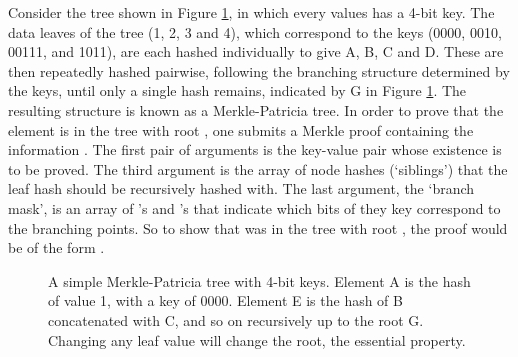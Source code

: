 Consider the tree shown in Figure \ref{fig:Merkleexample}, in which every values has a 4-bit key. The data leaves of the tree (1, 2, 3 and 4), which correspond to the keys (0000, 0010, 00111, and 1011), are each hashed individually to give A, B, C and D. These are then repeatedly hashed pairwise, following the branching structure determined by the keys, until only a single hash remains, indicated by G in Figure \ref{fig:Merkleexample}. The resulting structure is known as a Merkle-Patricia tree. In order to prove that the element  is in the tree with root , one submits a Merkle proof containing the information . The first pair of arguments is the key-value pair whose existence is to be proved. The third argument is the array of node hashes (`siblings') that the leaf hash should be recursively hashed with. The last argument, the `branch mask', is an array of 's and 's that indicate which bits of they key correspond to the branching points. So to show that  was in the tree with root , the proof would be of the form .

\begin{figure}
\centering
 \caption{A simple Merkle-Patricia tree with 4-bit keys. Element A is the hash of value 1, with a key of 0000. Element E is the hash of B concatenated with C, and so on recursively up to the root G. Changing any leaf value will change the root, the essential property.}
 \label{fig:Merkleexample}
\end{figure}


